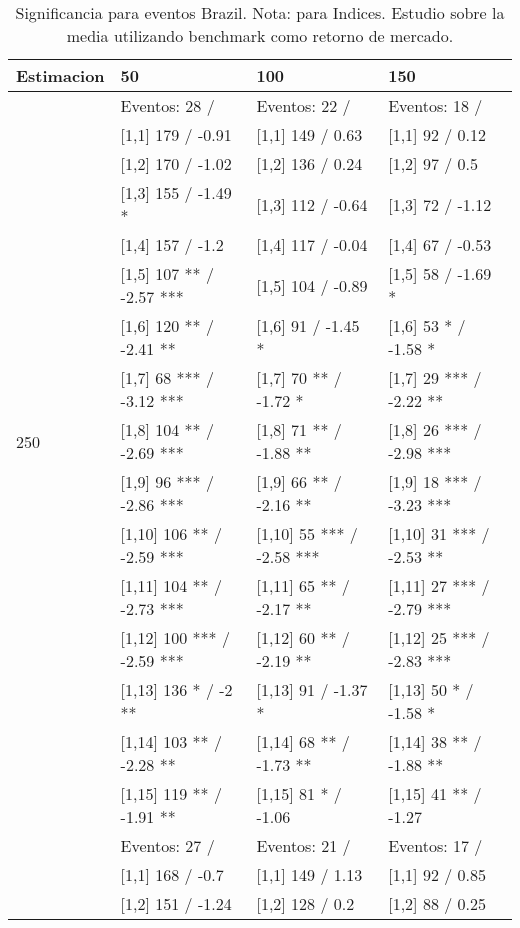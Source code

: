 \begin{table}

\caption{Significancia para eventos Brazil. Nota: para Indices. Estudio sobre la media utilizando benchmark como retorno de mercado.}
\centering
\begin{tabular}[t]{llll}
\toprule
Estimacion & 50 & 100 & 150\\
\midrule
 & Eventos:  28 / & Eventos:  22 / & Eventos:  18 /\\
 & {}[1,1] 179  / -0.91 & {}[1,1] 149  / 0.63 & {}[1,1] 92  / 0.12\\
 & {}[1,2] 170  / -1.02 & {}[1,2] 136  / 0.24 & {}[1,2] 97  / 0.5\\
 & {}[1,3] 155  / -1.49 * & {}[1,3] 112  / -0.64 & {}[1,3] 72  / -1.12\\
 & {}[1,4] 157  / -1.2 & {}[1,4] 117  / -0.04 & {}[1,4] 67  / -0.53\\
\addlinespace
 & {}[1,5] 107 ** / -2.57 *** & {}[1,5] 104  / -0.89 & {}[1,5] 58  / -1.69 *\\
 & {}[1,6] 120 ** / -2.41 ** & {}[1,6] 91  / -1.45 * & {}[1,6] 53 * / -1.58 *\\
 & {}[1,7] 68 *** / -3.12 *** & {}[1,7] 70 ** / -1.72 * & {}[1,7] 29 *** / -2.22 **\\
250 & {}[1,8] 104 ** / -2.69 *** & {}[1,8] 71 ** / -1.88 ** & {}[1,8] 26 *** / -2.98 ***\\
 & {}[1,9] 96 *** / -2.86 *** & {}[1,9] 66 ** / -2.16 ** & {}[1,9] 18 *** / -3.23 ***\\
\addlinespace
 & {}[1,10] 106 ** / -2.59 *** & {}[1,10] 55 *** / -2.58 *** & {}[1,10] 31 *** / -2.53 **\\
 & {}[1,11] 104 ** / -2.73 *** & {}[1,11] 65 ** / -2.17 ** & {}[1,11] 27 *** / -2.79 ***\\
 & {}[1,12] 100 *** / -2.59 *** & {}[1,12] 60 ** / -2.19 ** & {}[1,12] 25 *** / -2.83 ***\\
 & {}[1,13] 136 * / -2 ** & {}[1,13] 91  / -1.37 * & {}[1,13] 50 * / -1.58 *\\
 & {}[1,14] 103 ** / -2.28 ** & {}[1,14] 68 ** / -1.73 ** & {}[1,14] 38 ** / -1.88 **\\
\addlinespace
 & {}[1,15] 119 ** / -1.91 ** & {}[1,15] 81 * / -1.06 & {}[1,15] 41 ** / -1.27\\
 & Eventos:  27 / & Eventos:  21 / & Eventos:  17 /\\
 & {}[1,1] 168  / -0.7 & {}[1,1] 149  / 1.13 & {}[1,1] 92  / 0.85\\
 & {}[1,2] 151  / -1.24 & {}[1,2] 128  / 0.2 & {}[1,2] 88  / 0.25\\

\end{tabular}
\end{table}
